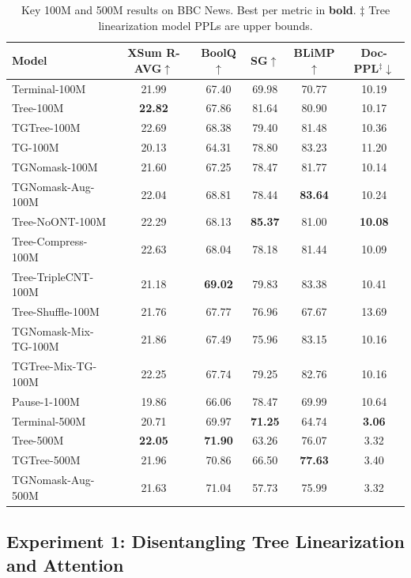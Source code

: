 \documentclass[11pt]{article}
\begin{document}
\begin{table}[htbp]
  \centering
  \setlength{\tabcolsep}{9pt}
  \begin{tabular}{lccccc}
    \toprule
    Model & XSum R-AVG$\uparrow$ & BoolQ$\uparrow$ & SG$\uparrow$ & BLiMP$\uparrow$ & Doc-PPL$^\ddagger$$\downarrow$ \\
    \midrule
    Terminal-100M & 21.99 & 67.40 & 69.98 & 70.77 & 10.19 \\
    Tree-100M & \textbf{22.82} & 67.86 & 81.64 & 80.90 & 10.17 \\
    TGTree-100M & 22.69 & 68.38 & 79.40 & 81.48 & 10.36 \\
    TG-100M & 20.13 & 64.31 & 78.80 & 83.23 & 11.20 \\
    TGNomask-100M & 21.60 & 67.25 & 78.47 & 81.77 & 10.14 \\
    TGNomask-Aug-100M & 22.04 & 68.81 & 78.44 & \textbf{83.64} & 10.24 \\
    Tree-NoONT-100M & 22.29 & 68.13 & \textbf{85.37} & 81.00 & \textbf{10.08} \\
    Tree-Compress-100M & 22.63 & 68.04 & 78.18 & 81.44 & 10.09 \\
    Tree-TripleCNT-100M & 21.18 & \textbf{69.02} & 79.83 & 83.38 & 10.41 \\
    Tree-Shuffle-100M & 21.76 & 67.77 & 76.96 & 67.67 & 13.69 \\
    TGNomask-Mix-TG-100M & 21.86 & 67.49 & 75.96 & 83.15 & 10.16 \\
    TGTree-Mix-TG-100M & 22.25 & 67.74 & 79.25 & 82.76 & 10.16 \\
    Pause-1-100M & 19.86 & 66.06 & 78.47 & 69.99 & 10.64 \\
    \midrule
    Terminal-500M & 20.71 & 69.97 & \textbf{71.25} & 64.74 & \textbf{3.06} \\
    Tree-500M & \textbf{22.05} & \textbf{71.90} & 63.26 & 76.07 & 3.32\\
    TGTree-500M & 21.96 & 70.86 & 66.50 & \textbf{77.63} & 3.40\\
    TGNomask-Aug-500M & 21.63 & 71.04 & 57.73 & 75.99 & 3.32\\
    \bottomrule
  \end{tabular}
  \caption{Key 100M and 500M results on BBC News. Best per metric in \textbf{bold}. $\ddagger$ Tree linearization model PPLs are upper bounds.}
  \label{tab:exp1-results}
\end{table}

\subsection{Experiment 1: Disentangling Tree Linearization and Attention}
\label{sec:exp1}
\end{document}
